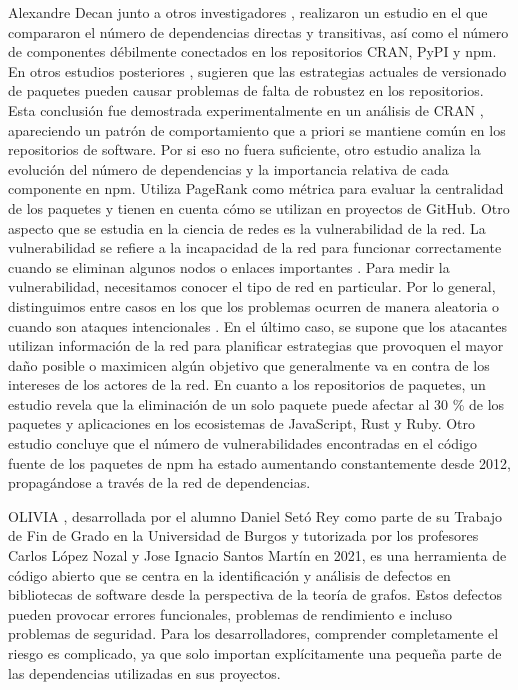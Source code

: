 Alexandre Decan junto a otros investigadores \cite{10.1145/2993412.3003382}, realizaron un estudio en el que compararon el número de dependencias
directas y transitivas, así como el número de componentes débilmente conectados en los repositorios CRAN, PyPI y npm.
En otros estudios posteriores \cite{10.1109/SANER.2017.7884604}, sugieren que las estrategias actuales de versionado de paquetes
pueden causar problemas de falta de robustez en los repositorios. Esta conclusión fue demostrada experimentalmente en un análisis de
CRAN \cite{10.1109/SANER.2016.12}, apareciendo un patrón de comportamiento que a priori se mantiene común en los repositorios de software.
Por si eso no fuera suficiente, otro estudio \cite{10.1145/2901739.2901743} analiza la evolución del número de dependencias y la importancia
relativa de cada componente en npm. Utiliza PageRank como métrica para evaluar la centralidad de los paquetes y tienen en cuenta cómo
se utilizan en proyectos de GitHub.
Otro aspecto que se estudia en la ciencia de redes es la vulnerabilidad de la red. La vulnerabilidad se refiere a la incapacidad de la
red para funcionar correctamente cuando se eliminan algunos nodos o enlaces importantes \cite{posfai2016network}. Para medir la vulnerabilidad,
necesitamos conocer el tipo de red en particular. Por lo general, distinguimos entre casos en los que los problemas ocurren de manera aleatoria
o cuando son ataques intencionales \cite{Albert2000}. En el último caso, se supone que los atacantes utilizan información de la red para
planificar estrategias que provoquen el mayor daño posible o maximicen algún objetivo que generalmente va en contra de los intereses de los
actores de la red.
En cuanto a los repositorios de paquetes, un estudio \cite{10.1145/2901739.2901743} revela que la eliminación de un solo paquete puede
afectar al 30 \% de los paquetes y aplicaciones en los ecosistemas de JavaScript, Rust y Ruby.
Otro estudio \cite{10.1145/3196398.3196401} concluye que el número de vulnerabilidades encontradas en el código fuente de los paquetes
de npm ha estado aumentando constantemente desde 2012, propagándose a través de la red de dependencias.

OLIVIA \cite{daniel_2022_7358391}, desarrollada por el alumno Daniel Setó Rey como parte de su Trabajo de Fin de Grado en la Universidad de Burgos y tutorizada por los profesores Carlos López Nozal y Jose Ignacio Santos Martín en 2021, es una herramienta de código abierto que se centra en la identificación y análisis de defectos en bibliotecas de software desde la perspectiva de la teoría de grafos. Estos defectos pueden provocar errores funcionales, problemas de rendimiento e incluso problemas de seguridad. Para los desarrolladores, comprender completamente el riesgo es complicado, ya que solo importan explícitamente una pequeña parte de las dependencias utilizadas en sus proyectos.


